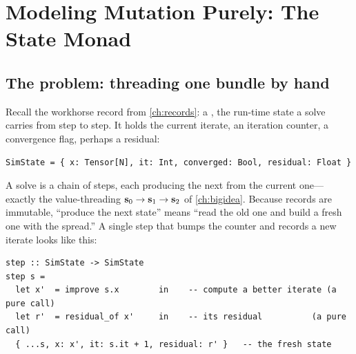 \chapter{Modeling Mutation Purely: The State Monad}
\label{ch:monad}


\section{The problem: threading one bundle by hand}
\label{sec:problem}

Recall the workhorse record from \cref{ch:records}: a , the run-time
state a solve carries from step to step. It holds the current iterate, an iteration
counter, a convergence flag, perhaps a residual:

\begin{lstlisting}[style=l4style]
SimState = { x: Tensor[N], it: Int, converged: Bool, residual: Float }
\end{lstlisting}

\noindent A solve is a chain of steps, each producing the next  from
the current one---exactly the value-threading $\mathbf{s}_0 \to \mathbf{s}_1 \to \mathbf{s}_2$ of
\cref{ch:bigidea}. Because records are immutable, ``produce the next state'' means
``read the old one and build a fresh one with the spread.'' A single step that
bumps the counter and records a new iterate looks like this:

\begin{lstlisting}[style=l4style]
step :: SimState -> SimState
step s =
  let x'  = improve s.x        in    -- compute a better iterate (a pure call)
  let r'  = residual_of x'     in    -- its residual          (a pure call)
  { ...s, x: x', it: s.it + 1, residual: r' }   -- the fresh state
\end{lstlisting}

